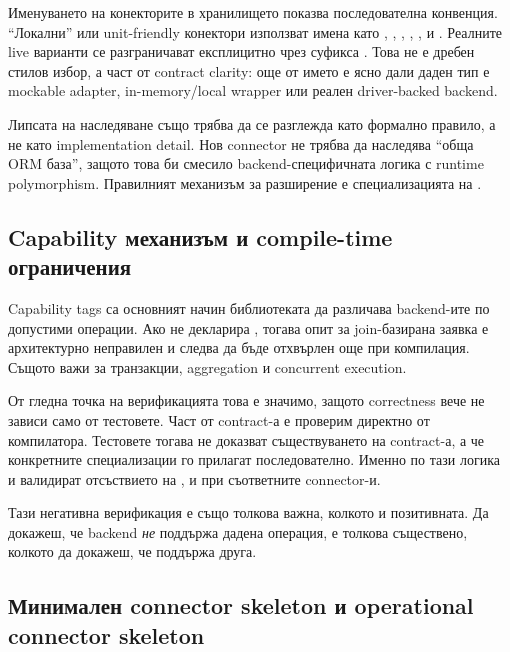 Именуването на конекторите в хранилището показва последователна конвенция. ``Локални'' или unit-friendly конектори използват имена като , , , , ,  и . Реалните live варианти се разграничават експлицитно чрез суфикса . Това не е дребен стилов избор, а част от contract clarity: още от името е ясно дали даден тип е mockable adapter, in-memory/local wrapper или реален driver-backed backend.

Липсата на наследяване също трябва да се разглежда като формално правило, а не като implementation detail. Нов connector не трябва да наследява ``обща ORM база'', защото това би смесило backend-специфичната логика с runtime polymorphism. Правилният механизъм за разширение е специализацията на .

\subsection{Capability механизъм и compile-time ограничения}

Capability tags са основният начин библиотеката да различава backend-ите по допустими операции. Ако  не декларира , тогава опит за join-базирана заявка е архитектурно неправилен и следва да бъде отхвърлен още при компилация. Същото важи за транзакции, aggregation и concurrent execution.

От гледна точка на верификацията това е значимо, защото correctness вече не зависи само от тестовете. Част от contract-а е проверим директно от компилатора. Тестовете тогава не доказват съществуването на contract-а, а че конкретните специализации го прилагат последователно. Именно по тази логика  и  валидират отсъствието на ,  и  при съответните connector-и.

Тази негативна верификация е също толкова важна, колкото и позитивната. Да докажеш, че backend \emph{не} поддържа дадена операция, е толкова съществено, колкото да докажеш, че поддържа друга.

\subsection{Минимален connector skeleton и operational connector skeleton}

